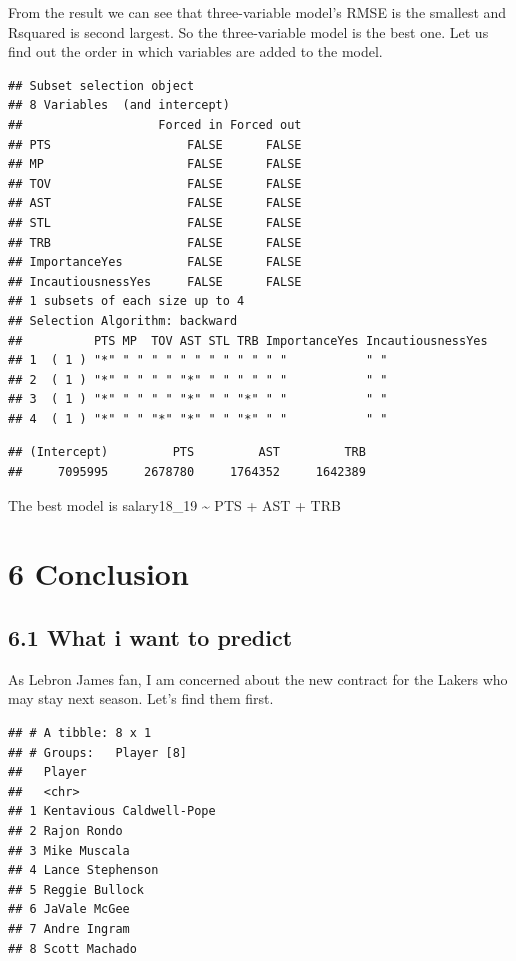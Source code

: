 \documentclass[]{article}
\begin{document}
From the result we can see that three-variable model's RMSE is the
smallest and Rsquared is second largest. So the three-variable model is
the best one. Let us find out the order in which variables are added to
the model.

\begin{verbatim}
## Subset selection object
## 8 Variables  (and intercept)
##                   Forced in Forced out
## PTS                   FALSE      FALSE
## MP                    FALSE      FALSE
## TOV                   FALSE      FALSE
## AST                   FALSE      FALSE
## STL                   FALSE      FALSE
## TRB                   FALSE      FALSE
## ImportanceYes         FALSE      FALSE
## IncautiousnessYes     FALSE      FALSE
## 1 subsets of each size up to 4
## Selection Algorithm: backward
##          PTS MP  TOV AST STL TRB ImportanceYes IncautiousnessYes
## 1  ( 1 ) "*" " " " " " " " " " " " "           " "              
## 2  ( 1 ) "*" " " " " "*" " " " " " "           " "              
## 3  ( 1 ) "*" " " " " "*" " " "*" " "           " "              
## 4  ( 1 ) "*" " " "*" "*" " " "*" " "           " "
\end{verbatim}

\begin{verbatim}
## (Intercept)         PTS         AST         TRB 
##     7095995     2678780     1764352     1642389
\end{verbatim}

The best model is salary18\_19 \textasciitilde{} PTS + AST + TRB

\section{6 Conclusion}\label{conclusion}

\subsection{6.1 What i want to predict}\label{what-i-want-to-predict}

As Lebron James fan, I am concerned about the new contract for the
Lakers who may stay next season. Let's find them first.

\begin{verbatim}
## # A tibble: 8 x 1
## # Groups:   Player [8]
##   Player                  
##   <chr>                   
## 1 Kentavious Caldwell-Pope
## 2 Rajon Rondo             
## 3 Mike Muscala            
## 4 Lance Stephenson        
## 5 Reggie Bullock          
## 6 JaVale McGee            
## 7 Andre Ingram            
## 8 Scott Machado
\end{verbatim}
\end{document}
